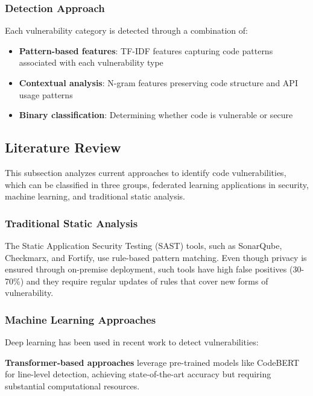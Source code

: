 \documentclass[pdflatex,sn-mathphys-num]{sn-jnl}
\theoremstyle{thmstyleone}%
\theoremstyle{thmstyletwo}%
\theoremstyle{thmstylethree}%
\begin{document}
\subsubsection{Detection Approach}\label{subsubsec:detection}

Each vulnerability category is detected through a combination of:
\begin{itemize}
    \item \textbf{Pattern-based features}: TF-IDF features capturing code patterns associated with each vulnerability type
    \item \textbf{Contextual analysis}: N-gram features preserving code structure and API usage patterns
    \item \textbf{Binary classification}: Determining whether code is vulnerable or secure
\end{itemize}

\subsection{Literature Review}\label{subsec:literature}

This subsection analyzes current approaches to identify code vulnerabilities, which can be classified in three groups, federated learning applications in security, machine learning, and traditional static analysis.

\subsubsection{Traditional Static Analysis}\label{subsubsec:sast}

The Static Application Security Testing (SAST) tools, such as SonarQube, Checkmarx, and Fortify, use rule-based pattern matching. Even though privacy is ensured through on-premise deployment, such tools have high false positives (30-70\%) \cite{li2024sasteval} and they require regular updates of rules that cover new forms of vulnerability.


\subsubsection{Machine Learning Approaches}\label{subsubsec:ml}

Deep learning has been used in recent work to detect vulnerabilities:

\textbf{Transformer-based approaches} \cite{fu2024linevul} leverage pre-trained models like CodeBERT for line-level detection, achieving state-of-the-art accuracy but requiring substantial computational resources.
\end{document}
